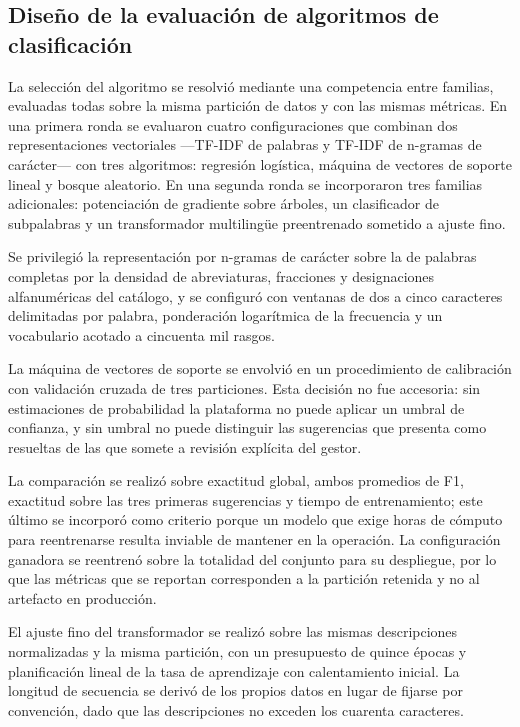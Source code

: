 \subsection{Diseño de la evaluación de algoritmos de clasificación}
La selección del algoritmo se resolvió mediante una competencia entre familias, evaluadas todas sobre la misma partición de datos y con las mismas métricas. En una primera ronda se evaluaron cuatro configuraciones que combinan dos representaciones vectoriales —TF-IDF de palabras y TF-IDF de n-gramas de carácter— con tres algoritmos: regresión logística, máquina de vectores de soporte lineal y bosque aleatorio. En una segunda ronda se incorporaron tres familias adicionales: potenciación de gradiente sobre árboles, un clasificador de subpalabras y un transformador multilingüe preentrenado sometido a ajuste fino.

Se privilegió la representación por n-gramas de carácter sobre la de palabras completas por la densidad de abreviaturas, fracciones y designaciones alfanuméricas del catálogo, y se configuró con ventanas de dos a cinco caracteres delimitadas por palabra, ponderación logarítmica de la frecuencia y un vocabulario acotado a cincuenta mil rasgos.

La máquina de vectores de soporte se envolvió en un procedimiento de calibración con validación cruzada de tres particiones. Esta decisión no fue accesoria: sin estimaciones de probabilidad la plataforma no puede aplicar un umbral de confianza, y sin umbral no puede distinguir las sugerencias que presenta como resueltas de las que somete a revisión explícita del gestor.

La comparación se realizó sobre exactitud global, ambos promedios de F1, exactitud sobre las tres primeras sugerencias y tiempo de entrenamiento; este último se incorporó como criterio porque un modelo que exige horas de cómputo para reentrenarse resulta inviable de mantener en la operación. La configuración ganadora se reentrenó sobre la totalidad del conjunto para su despliegue, por lo que las métricas que se reportan corresponden a la partición retenida y no al artefacto en producción.

El ajuste fino del transformador se realizó sobre las mismas descripciones normalizadas y la misma partición, con un presupuesto de quince épocas y planificación lineal de la tasa de aprendizaje con calentamiento inicial. La longitud de secuencia se derivó de los propios datos en lugar de fijarse por convención, dado que las descripciones no exceden los cuarenta caracteres.

